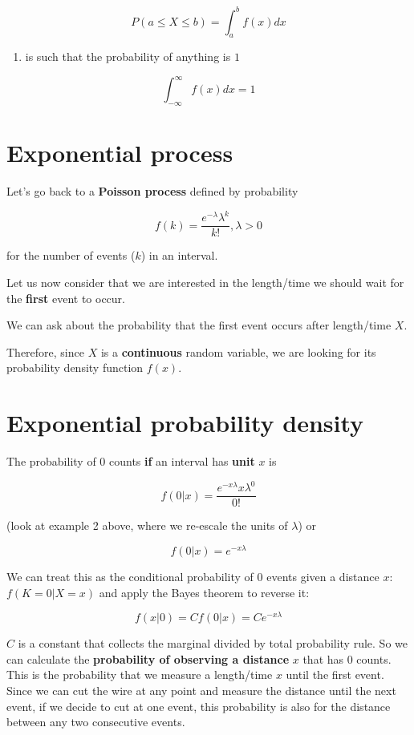 \documentclass[
]{book}
\providecommand{\tightlist}{%
  \setlength{\itemsep}{0pt}\setlength{\parskip}{0pt}}
\begin{document}
\[P(a\leq X \leq b)=\int_{a}^{b} f(x) dx\]

\begin{enumerate}
\def\labelenumi{\arabic{enumi})}
\setcounter{enumi}{2}
\tightlist
\item
  is such that the probability of anything is \(1\)
\end{enumerate}

\[\int_{-\infty}^{\infty} f(x) dx = 1\]

\hypertarget{exponential-process}{%
\section{Exponential process}\label{exponential-process}}

Let's go back to a \textbf{Poisson process} defined by probability

\[f(k)=\frac{e^{-\lambda}\lambda^k}{k!}, \lambda>0\]

for the number of events (\(k\)) in an interval.

Let us now consider that we are interested in the length/time we should wait for the \textbf{first} event to occur.

We can ask about the probability that the first event occurs after length/time \(X\).

Therefore, since \(X\) is a \textbf{continuous} random variable, we are looking for its probability density function \(f(x)\).

\hypertarget{exponential-probability-density}{%
\section{Exponential probability density}\label{exponential-probability-density}}

The probability of \(0\) counts \textbf{if} an interval has \textbf{unit} \(x\) is

\[f(0|x)=\frac{e^{-x\lambda}x\lambda^0}{0!}\]

(look at example 2 above, where we re-escale the units of \(\lambda\)) or

\[f(0|x)=e^{-x\lambda}\]

We can treat this as the conditional probability of \(0\) events given a distance \(x\): \(f(K=0|X=x)\) and apply the Bayes theorem to reverse it:

\[f(x|0)=C f(0|x)=C e^{-x\lambda}\]

\(C\) is a constant that collects the marginal divided by total probability rule. So we can calculate the \textbf{probability of observing a distance} \(x\) that has \(0\) counts. This is the probability that we measure a length/time \(x\) until the first event. Since we can cut the wire at any point and measure the distance until the next event, if we decide to cut at one event, this probability is also for the distance between any two consecutive events.
\end{document}
